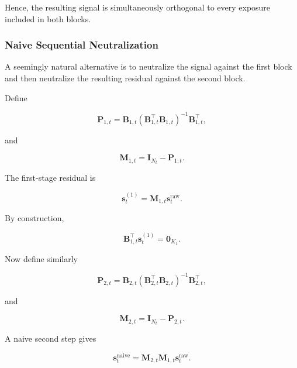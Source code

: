 \documentclass[11pt,a4paper]{article}
\begin{document}
Hence, the resulting signal is simultaneously orthogonal to every exposure
included in both blocks.


\subsubsection{Naive Sequential Neutralization}

A seemingly natural alternative is to neutralize the signal against the first
block and then neutralize the resulting residual against the second block.

Define

\begin{equation}
\mathbf{P}_{1,t}
=
\mathbf{B}_{1,t}
\left(
\mathbf{B}_{1,t}^\top
\mathbf{B}_{1,t}
\right)^{-1}
\mathbf{B}_{1,t}^\top,
\end{equation}

and

\begin{equation}
\boxed{
\mathbf{M}_{1,t}
=
\mathbf{I}_{N_t}
-
\mathbf{P}_{1,t}.
}
\end{equation}

The first-stage residual is

\begin{equation}
\boxed{
\mathbf{s}_t^{(1)}
=
\mathbf{M}_{1,t}
\mathbf{s}_t^{\mathrm{raw}}.
}
\end{equation}

By construction,

\begin{equation}
\mathbf{B}_{1,t}^\top
\mathbf{s}_t^{(1)}
=
\mathbf{0}_{K_1}.
\end{equation}

Now define similarly

\begin{equation}
\mathbf{P}_{2,t}
=
\mathbf{B}_{2,t}
\left(
\mathbf{B}_{2,t}^\top
\mathbf{B}_{2,t}
\right)^{-1}
\mathbf{B}_{2,t}^\top,
\end{equation}

and

\begin{equation}
\mathbf{M}_{2,t}
=
\mathbf{I}_{N_t}
-
\mathbf{P}_{2,t}.
\end{equation}

A naive second step gives

\begin{equation}
\boxed{
\mathbf{s}_t^{\mathrm{naive}}
=
\mathbf{M}_{2,t}
\mathbf{M}_{1,t}
\mathbf{s}_t^{\mathrm{raw}}.
}
\end{equation}
\end{document}
